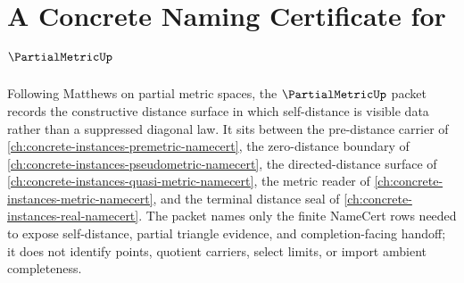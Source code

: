 \chapter{A Concrete Naming Certificate for $\PartialMetricUp$}
\label{ch:concrete-instances-partial-metric-namecert}

Following Matthews on partial metric spaces, the $\PartialMetricUp$ packet records the constructive distance surface in which self-distance is visible data rather than a suppressed diagonal law. It sits between the pre-distance carrier of \autoref{ch:concrete-instances-premetric-namecert}, the zero-distance boundary of \autoref{ch:concrete-instances-pseudometric-namecert}, the directed-distance surface of \autoref{ch:concrete-instances-quasi-metric-namecert}, the metric reader of \autoref{ch:concrete-instances-metric-namecert}, and the terminal distance seal of \autoref{ch:concrete-instances-real-namecert}. The packet names only the finite NameCert rows needed to expose self-distance, partial triangle evidence, and completion-facing handoff; it does not identify points, quotient carriers, select limits, or import ambient completeness.

